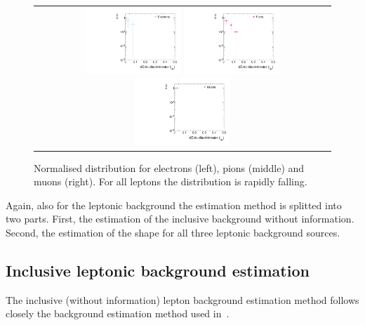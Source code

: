 \begin{figure}[!tb]
  \centering 
  \vspace{25pt}
  \begin{tabular}{c}
    \includegraphics[width=0.33\textwidth]{figures/analysis/Background/IasDistributionForElecs.pdf}
    \includegraphics[width=0.33\textwidth]{figures/analysis/Background/IasDistributionForPions.pdf}
    \includegraphics[width=0.33\textwidth]{figures/analysis/Background/IasDistributionForMuons.pdf}
  \end{tabular}
  \caption{Normalised \ias distribution for electrons (left), pions (middle) and muons (right). 
           For all leptons the \ias distribution is rapidly falling.}
  \label{fig:IasDist}
\vspace{25pt}
\end{figure}


Again, also for the leptonic background the estimation method is splitted into two parts.
First, the estimation of the inclusive background without \ias information.
Second, the estimation of the \ias shape for all three leptonic background sources.


\subsection*{Inclusive leptonic background estimation}
The inclusive (without \ias information) lepton background estimation method follows closely the background estimation method used in~\cite{bib:CMS:DT_Thesis,bib:CMS:DT_8TeV_AN}.

